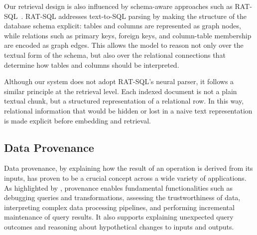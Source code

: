 \documentclass[11pt,a4paper]{article}
\begin{document}
Our retrieval design is also influenced by schema-aware approaches such as RAT-SQL~\cite{ratsql}. RAT-SQL addresses text-to-SQL parsing by making the structure of the database schema explicit: tables and columns are represented as graph nodes, while relations such as primary keys, foreign keys, and column-table membership are encoded as graph edges. This allows the model to reason not only over the textual form of the schema, but also over the relational connections that determine how tables and columns should be interpreted.

Although our system does not adopt RAT-SQL's neural parser, it follows a similar principle at the retrieval level. Each indexed document is not a plain textual chunk, but a structured representation of a relational row. In this way, relational information that would be hidden or lost in a naive text representation is made explicit before embedding and retrieval.


\subsection{Data Provenance}

Data provenance, by explaining how the result of an operation is derived from its inputs, has proven to be a crucial concept across a wide variety of applications. As highlighted by \cite{bookProvenance}, provenance enables fundamental functionalities such as debugging queries and transformations, assessing the trustworthiness of data, interpreting complex data processing pipelines, and performing incremental maintenance of query results. It also supports explaining unexpected query outcomes and reasoning about hypothetical changes to inputs and outputs.
\end{document}
